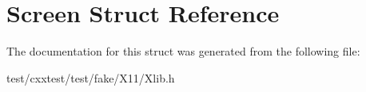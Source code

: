 \hypertarget{structScreen}{\section{Screen Struct Reference}
\label{structScreen}
}


The documentation for this struct was generated from the following file\-:\begin{DoxyCompactItemize}
\item 
test/cxxtest/test/fake/\-X11/Xlib.\-h\end{DoxyCompactItemize}

